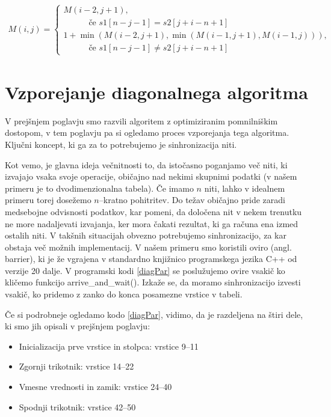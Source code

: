 \documentclass[a4paper,12pt,openright]{book}
\begin{document}
\begin{itemize}
\begin{equation}
\label{diagEq5}
\begin{aligned}
M(i, j) =
\begin{cases}
     M(i-2, j+1) ,     \\ \quad \quad \quad \text{če } s1[n-j-1]=s2[j+i-n+1]\\
     1 + \min(M(i-2, j+1), \min(M(i-1, j+1), M(i-1, j))) , \\ \quad \quad \quad \text{če } s1[n-j-1] \neq s2[j+i-n+1]
  \end{cases}
\end{aligned}
\end{equation}

\end{itemize}

\section{Vzporejanje diagonalnega algoritma}

V prejšnjem poglavju smo razvili algoritem z optimiziranim pomnilniškim dostopom, v tem poglavju pa si ogledamo proces vzporejanja tega algoritma. Ključni koncept, ki ga za to potrebujemo je sinhronizacija niti. 

Kot vemo, je glavna ideja večnitnosti to, da istočasno poganjamo več niti, ki izvajajo vsaka svoje operacije, običajno nad nekimi skupnimi podatki (v našem primeru je to dvodimenzionalna tabela). Če imamo $n$ niti, lahko v idealnem primeru torej dosežemo $n$--kratno pohitritev. Do težav običajno pride zaradi medsebojne odvisnosti podatkov, kar pomeni, da določena nit v nekem trenutku ne more nadaljevati izvajanja, ker mora čakati rezultat, ki ga računa ena izmed ostalih niti. V takšnih situacijah obvezno potrebujemo sinhronizacijo, za kar obstaja več možnih implementacij. V našem primeru smo koristili oviro (angl. barrier), ki je že vgrajena v standardno knjižnico programskega jezika C++ od verzije 20 dalje. V programski kodi \ref{diagPar} se poslužujemo ovire vsakič ko kličemo funkcijo arrive\_and\_wait(). Izkaže se, da moramo sinhronizacijo izvesti vsakič, ko pridemo z zanko do konca posamezne vrstice v tabeli.

Če si podrobneje ogledamo kodo \ref{diagPar}, vidimo, da je razdeljena na štiri dele, ki smo jih opisali v prejšnjem poglavju: 
\begin{itemize}
\item Inicializacija prve vrstice in stolpca: vrstice 9--11
\item Zgornji trikotnik: vrstice 14--22
\item Vmesne vrednosti in zamik: vrstice 24--40
\item Spodnji trikotnik: vrstice 42--50
\end{itemize}
\end{document}
